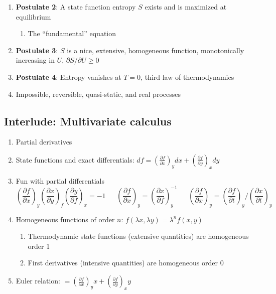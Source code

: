 \documentclass[11pt]{article}
\begin{document}
\begin{enumerate}
\item \textbf{Postulate 2}: A state function entropy \(S\) exists and is maximized at equilibrium
\begin{enumerate}
\item The ``fundamental'' equation
\end{enumerate}

\item \textbf{Postulate 3}: \(S\) is a nice, extensive, homogeneous function, monotonically increasing in \(U\), \(\partial S/\partial U \geq 0\)

\item \textbf{Postulate 4}: Entropy vanishes at \(T = 0\), third law of thermodynamics
\item Impossible, reversible, quasi-static, and real processes
\end{enumerate}

\subsection{Interlude: Multivariate calculus}
\label{sec:orgd0244fb}
\begin{enumerate}
\item Partial derivatives
\item State functions and exact differentials: \(df =\left (
       \frac{\partial f}{\partial x} \right )_y dx + \left (
       \frac{\partial f}{\partial y} \right )_x dy\)
\item Fun with partial differentials
\begin{equation*}
 \left ( \frac{\partial f}{\partial x} \right )_y    \left ( \frac{\partial
     x}{\partial y} \right )_f    \left ( \frac{\partial y}{\partial f} \right )_x =
 -1 \ \ \ \ \ \ \    \left ( \frac{\partial f}{\partial x} \right )_y  =   \left (
   \frac{\partial x}{\partial f} \right )_y^{-1}  \ \ \ \ \ \ \    \left (
   \frac{\partial f}{\partial x} \right )_y  =   \left ( \frac{\partial f}{\partial t}
 \right )_y  /   \left ( \frac{\partial x}{\partial t} \right )_y
\end{equation*}

\item Homogeneous functions of order \(n\): \(f(\lambda x, \lambda y ) = \lambda^n f(x,y)\)
\begin{enumerate}
\item Thermodynamic state functions (extensive quantities) are homogeneous order 1
\item First derivatives (intensive quantities) are homogeneous order 0
\end{enumerate}
\item Euler relation: \(=\left (
       \frac{\partial f}{\partial x} \right )_y x + \left (
       \frac{\partial f}{\partial y} \right )_x y\)
\end{enumerate}
\end{document}

